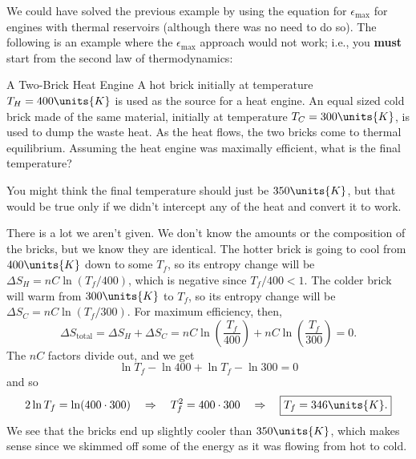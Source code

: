 We could have solved the previous example by using the equation for
$\epsilon_\text{max}$ for engines with thermal reservoirs (although 
there was no need to do so).  The following is an example where 
the $\epsilon_\text{max}$ approach would not work; i.e., you
{\bf must} start from the second law of thermodynamics:
\begin{example}{A Two-Brick Heat Engine}
  \label{example:two_brick_heat_engine}
  A hot brick initially at temperature $T_H=400\units{K}$ is used as
  the source for a heat engine.  An equal sized cold brick made of the
  same material, initially at temperature $T_C=300\units{K}$, is used
  to dump the waste heat.  As the heat flows, the two bricks come to
  thermal equilibrium.  Assuming the heat engine was maximally
  efficient, what is the final temperature?

  \solution You might think the final temperature should just be
  $350\units{K}$, but that would be true only if we didn't intercept
  any of the heat and convert it to work.

  There is a lot we aren't given.  We don't know the amounts
  or the composition of the bricks, but we know they are identical.
  The hotter brick is going to cool from $400\units{K}$ down to some
  $T_f$, so its entropy change will be $\Delta S_H = nC\ln(T_f/400)$,
  which is negative since $T_f/400<1$.  The colder brick will warm
  from $300\units{K}$ to $T_f$, so its entropy change will be $\Delta
  S_C=nC\ln(T_f/300)$.  For maximum efficiency, then,
\begin{equation}
\Delta S_\text{total} = \Delta S_H+ \Delta S_C =
nC\ln\left(\frac{T_f}{400}\right) + nC\ln\left(\frac{T_f}{300}\right)
= 0.
\end{equation}
The $nC$ factors divide out, and we get
\begin{equation}
  \ln T_f - \ln 400 + \ln T_f - \ln 300 = 0
\end{equation}
and so
\begin{equation}
2\ln T_f = \ln(400\cdot 300) \quad\Rightarrow\quad 
T_f^2=400\cdot 300 \quad\Rightarrow\quad \boxed{T_f = 346\units{K}.}
\end{equation}
We see that the bricks end up slightly cooler than $350\units{K}$,
which makes sense since we skimmed off some of the energy as it was
flowing from hot to cold.
\end{example}

